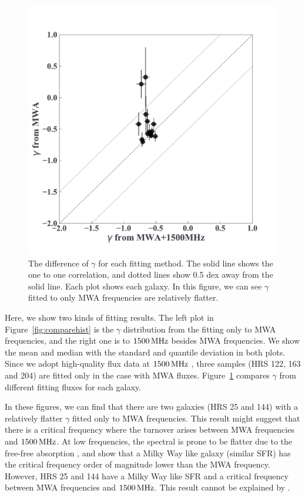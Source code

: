 \begin{figure}[htbp]
	\centering
	\includegraphics[width=.6\linewidth]{Chapter_5/Figures/Result_comparealpha.pdf}
    \caption[The comparison of $\gamma$ from different fitting methods]{\label{fig:comparegamma}
        The difference of $\gamma$ for each fitting method.
        The solid line shows the one to one correlation, and dotted lines show 0.5 dex away from the solid line.
        Each plot shows each galaxy.
        In this figure, we can see $\gamma$ fitted to only MWA frequencies are relatively flatter.
    }
\end{figure}

Here, we show two kinds of fitting results.
The left plot in Figure~\ref{fig:comparehist} is the $\gamma$ distribution from the fitting only to MWA frequencies, and the right one is to $1500\,\mathrm{MHz}$ besides MWA frequencies.
We show the mean and median with the standard and quantile deviation in both plots.
Since we adopt high-quality flux data at $1500\,\mathrm{MHz}$ \citep{Boselli2015}, three samples (HRS 122, 163 and 204) are fitted only in the case with MWA fluxes.
Figure~\ref{fig:comparegamma} compares $\gamma$ from different fitting fluxes for each galaxy.

In these figures, we can find that there are two galaxies (HRS 25 and 144) with a relatively flatter $\gamma$ fitted only to MWA frequencies.
This result might suggest that there is a critical frequency where the turnover arises between MWA frequencies and $1500\,\mathrm{MHz}$.
At low frequencies, the spectral is prone to be flatter due to the free-free absorption \citep[e.g.,][]{CalistroRivera2017a, Schober2017, Chyzy2018}, and \citet{Schober2017} show that a Milky Way like galaxy (similar SFR) has the critical frequency order of magnitude lower than the MWA frequency.
However, HRS 25 and 144 have a Milky Way like SFR \citep{Boselli2015} and a critical frequency between MWA frequencies and $1500\,\mathrm{MHz}$.
This result cannot be explained by \citet{Schober2017}.

